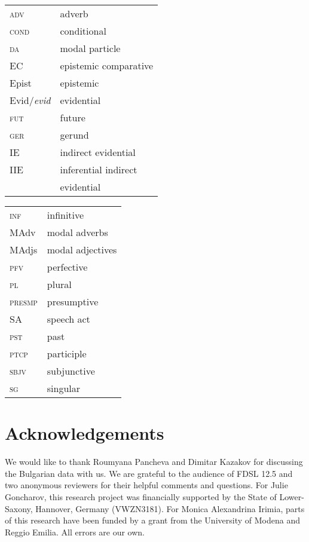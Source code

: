 \documentclass[output=paper,
]{langscibook}
\begin{document}
\begin{tabularx}{.47\textwidth}{ll}
\textsc{adv}&adverb\\
\textsc{cond}&conditional\\
\textsc{da}&modal particle\\
EC&epistemic comparative\\
Epist&epistemic\\
Evid/\textit{evid}&evidential\\
\textsc{fut}&future\\
\textsc{ger}&gerund\\
IE&indirect evidential\\
IIE&inferential indirect\\
& evidential\\
\end{tabularx}
\begin{tabularx}{.47\textwidth}{ll}
\textsc{inf}&infinitive\\
{MAdv}&modal adverbs\\ 
{MAdjs}&modal adjectives\\
\textsc{pfv}&perfective\\
\textsc{pl}&plural\\
\textsc{presmp}&presumptive\\
SA&speech act\\
\textsc{pst}&past\\
\textsc{ptcp}&participle\\
\textsc{sbjv}&subjunctive\\
\textsc{sg}&singular\\
\end{tabularx}

\section*{Acknowledgements}
We would like to thank Roumyana Pancheva and Dimitar Kazakov for discussing the Bulgarian data with us. We are grateful to the audience of FDSL 12.5 and two anonymous reviewers for their helpful comments and questions. For Julie Goncharov, this research project was financially supported by the State of Lower-Saxony, Hannover, Germany (VWZN3181). For Monica Alexandrina Irimia, parts of this research have been funded by a grant from the University of Modena and Reggio Emilia. All errors are our own.

\sloppy
\printbibliography[heading=subbibliography,notkeyword=this]
\end{document}
